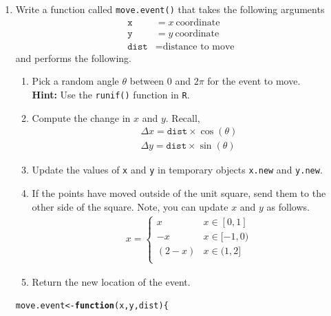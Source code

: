 \documentclass{article}\usepackage[]{graphicx}\usepackage[]{xcolor}
\makeatletter
\newcommand{\hldef}[1]{\textcolor[rgb]{0.345,0.345,0.345}{#1}}%
\newcommand{\hlkwa}[1]{\textcolor[rgb]{0.161,0.373,0.58}{\textbf{#1}}}%
\newcommand{\hlkwb}[1]{\textcolor[rgb]{0.69,0.353,0.396}{#1}}%
\newcommand{\hlkwc}[1]{\textcolor[rgb]{0.333,0.667,0.333}{#1}}%
\newenvironment{kframe}{%
 \def\at@end@of@kframe{}%
 \ifinner\ifhmode%
  \def\at@end@of@kframe{\end{minipage}}%
  \begin{minipage}{\columnwidth}%
 \fi\fi%
 \def\FrameCommand##1{\hskip\@totalleftmargin \hskip-\fboxsep
 \colorbox{shadecolor}{##1}\hskip-\fboxsep
     \hskip-\linewidth \hskip-\@totalleftmargin \hskip\columnwidth}%
 \MakeFramed {\advance\hsize-\width
   \@totalleftmargin\z@ \linewidth\hsize
   \@setminipage}}%
 {\par\unskip\endMakeFramed%
 \at@end@of@kframe}
\newenvironment{knitrout}{}{} %
\makeatother
\begin{document}
\begin{enumerate}
\item Write a function called \texttt{move.event()} that takes the following arguments
\begin{align*}
\texttt{x} &= x~\textrm{coordinate}\\
\texttt{y} &= y~\textrm{coordinate}\\
\texttt{dist} &= \textrm{distance to move}
\end{align*}
and performs the following.
\begin{enumerate}
\item Pick a random angle $\theta$ between $0$ and $2\pi$ for the event to move.\\
\textbf{Hint:} Use the \texttt{runif()} function in \texttt{R}.
\item Compute the change in $x$ and $y$. Recall,
\begin{align*}
\Delta{x} = \texttt{dist} \times \cos(\theta)\\
\Delta{y} = \texttt{dist} \times \sin(\theta)
\end{align*}
\item Update the values of \texttt{x} and \texttt{y} in temporary objects \texttt{x.new} and \texttt{y.new}.
\item If the points have moved outside of the unit square, send them to the other side of the square. Note, you can update $x$ and $y$ as follows.
\begin{align*}
x = 
\begin{cases}
x   & x \in  [0, 1] \\
-x   & x \in  [-1, 0)\\
(2-x) & x \in  (1, 2] \\
\end{cases}
\end{align*}
\item Return the new location of the event.
\end{enumerate}

\begin{knitrout}\scriptsize
{}\color{fgcolor}\begin{kframe}
\begin{alltt}
\hldef{move.event} \hlkwb{<-} \hlkwa{function}\hldef{(}\hlkwc{x}\hldef{,} \hlkwc{y}\hldef{,} \hlkwc{dist}\hldef{)\{}


\end{alltt}
\end{kframe}
\end{knitrout}
\end{enumerate}
\end{document}
